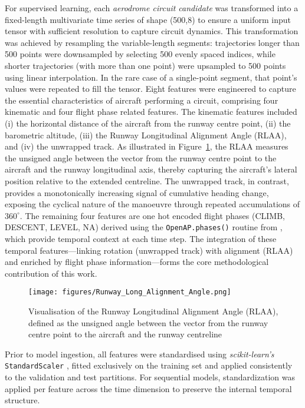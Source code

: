 \documentclass[
  manuscript=proceedings,  %
  layout=preprint,         %
  year=2025,
  volume=x,
]{extra/joas}
\begin{document}
For supervised learning, each \textit{aerodrome circuit candidate} was transformed into a fixed-length multivariate time series of shape (500,8) to ensure a uniform input tensor with sufficient resolution to capture circuit dynamics. This transformation was achieved by resampling the variable-length segments: trajectories longer than 500 points were downsampled by selecting 500 evenly spaced indices, while shorter trajectories (with more than one point) were upsampled to 500 points using linear interpolation. In the rare case of a single-point segment, that point's values were repeated to fill the tensor. Eight features were engineered to capture the essential characteristics of aircraft performing a circuit, comprising four kinematic and four flight phase related features. The kinematic features included (i) the horizontal distance of the aircraft from the runway centre point, (ii) the barometric altitude, (iii) the Runway Longitudinal Alignment Angle (RLAA), and (iv) the unwrapped track. As illustrated in Figure~\ref{fig:runway_angle}, the RLAA measures the unsigned angle between the vector from the runway centre point to the aircraft and the runway longitudinal axis, thereby capturing the aircraft’s lateral position relative to the extended centreline. The unwrapped track, in contrast, provides a monotonically increasing signal of cumulative heading change, exposing the cyclical nature of the manoeuvre through repeated accumulations of $360^\circ$. The remaining four features are one hot encoded flight phases (CLIMB, DESCENT, LEVEL, NA) derived using the \texttt{OpenAP.phases()} routine from \textcite{sun2020openap}, which provide temporal context at each time step. The integration of these temporal features—linking rotation (unwrapped track) with alignment (RLAA) and enriched by flight phase information—forms the core methodological contribution of this work.

\begin{figure}[ht!]
  \centering
  \texttt{[image: figures/Runway\_Long\_Alignment\_Angle.png]}
   \caption{Visualisation of the Runway Longitudinal Alignment Angle (RLAA), defined as the unsigned angle between the vector from the runway centre point to the aircraft and the runway centreline}
  \label{fig:runway_angle}
\end{figure}

Prior to model ingestion, all features were standardised using \textit{scikit-learn's} \texttt{StandardScaler} \cite{scikit-learn}, fitted exclusively on the training set and applied consistently to the validation and test partitions. For sequential models, standardization was applied per feature across the time dimension to preserve the internal temporal structure.
\end{document}
